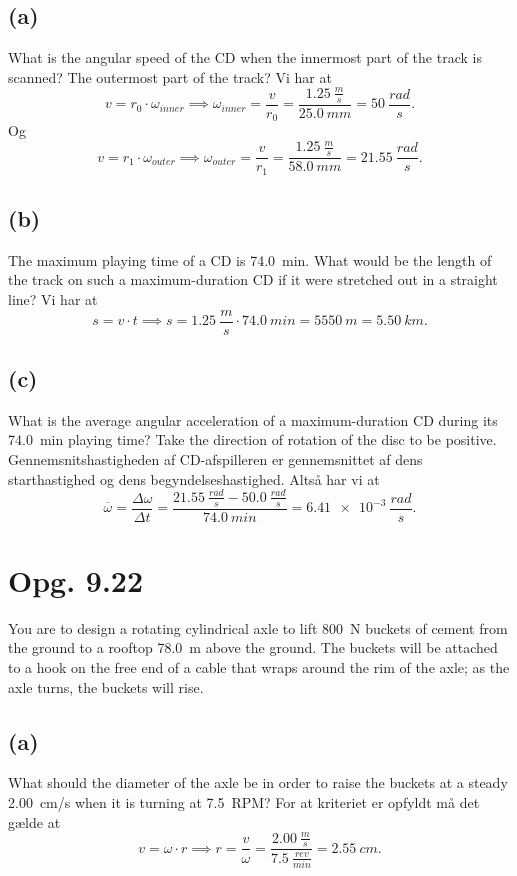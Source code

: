 \documentclass[12pt]{article}
\begin{document}
\subsection*{(a)}
What is the angular speed of the CD when the innermost part of the track is scanned? The outermost part of the track?
\bigbreak
Vi har at
\[
  v = r_0 \cdot \omega_{inner} \implies \omega_{inner} = \frac{v}{r_0} = \frac{\qty{1,25}{\frac{m}{s}}}{\qty{25,0}{mm}} = \qty{50}{\frac{rad}{s}}
.\]
Og
\[
v = r_1 \cdot \omega_{outer} \implies \omega_{outer} = \frac{v}{r_1} = \frac{\qty{1,25}{\frac{m}{s}}}{\qty{58,0}{mm}} = \qty{21,55}{\frac{rad}{s}} 
.\] 

\subsection*{(b)}
The maximum playing time of a CD is \qty{74,0}{min}. What would be the length of the track on such a maximum-duration CD if it were stretched out in a straight line?
\bigbreak
Vi har at
\[
s = v \cdot t \implies s = \qty{1,25}{\frac{m}{s}} \cdot \qty{74,0}{min} = \qty{5550}{m} = \qty{5,50}{km} 
.\] 

\subsection*{(c)}
What is the average angular acceleration of a maximum-duration CD during its \qty{74,0}{min} playing time? Take the direction of rotation of the disc to be positive.
\bigbreak
Gennemsnitshastigheden af CD-afspilleren er gennemsnittet af dens starthastighed og dens begyndelseshastighed. Altså har vi at
\[
\overline{\omega} = \frac{\Delta \omega}{\Delta t} = \frac{\qty{21,55}{\frac{rad}{s}} - \qty{50,0}{\frac{rad}{s}}}{\qty{74,0}{min}} = \qty{6,41e-3}{\frac{rad}{s}}
.\] 
  


\section*{Opg. 9.22}
You are to design a rotating cylindrical axle to lift \qty{800}{N} buckets of cement from the ground to a rooftop \qty{78,0}{m} above the ground. The buckets will be attached to a hook on the free end of a cable that wraps around the rim of the axle; as the axle turns, the buckets will rise.

\subsection*{(a)}
What should the diameter of the axle be in order to raise the buckets at a steady \qty{2,00}{cm/s} when it is turning at \qty{7,5}{RPM}?
\bigbreak
For at kriteriet er opfyldt må det gælde at
\[
v = \omega \cdot r \implies r = \frac{v}{\omega} = \frac{\qty{2,00}{\frac{m}{s}}}{\qty{7,5}{\frac{rev}{min}}} = \qty{2,55}{cm}
.\] 
\end{document}
